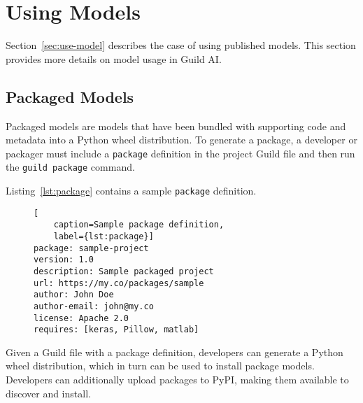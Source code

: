 \documentclass{article}
\begin{document}
\iffalse
\subsection{Manage Run Artifacts}

The final use case discussed involves managing runs and tracking run
artifacts. During both model development and use, it's helpful to
formally manage run artifacts both generated and consumed by model
operation. This is similar to source code revision control, where
developers can move backward and forward in time to view their
work. In the case of Guild AI, the revisions are the results of data
preparation, training experiments, model optimizations---anything that
might be generated by an operation.

Section~\ref{sec:runs} describes Guild AI run management.
\fi

\section{Using Models}

Section~\ref{sec:use-model} describes the case of using published
models. This section provides more details on model usage in Guild AI.

\subsection{Packaged Models}

Packaged models are models that have been bundled with supporting code
and metadata into a Python wheel distribution. To generate a package,
a developer or packager must include a \verb|package| definition in
the project Guild file and then run the \verb|guild package| command.

Listing~\ref{lst:package} contains a sample \verb|package| definition.

\begin{figure}
\begin{lstlisting}[
    caption=Sample package definition,
    label={lst:package}]
package: sample-project
version: 1.0
description: Sample packaged project
url: https://my.co/packages/sample
author: John Doe
author-email: john@my.co
license: Apache 2.0
requires: [keras, Pillow, matlab]
\end{lstlisting}
\end{figure}

Given a Guild file with a package definition, developers can generate
a Python wheel distribution, which in turn can be used to install
package models. Developers can additionally upload packages to PyPI,
making them available to discover and install.
\end{document}
